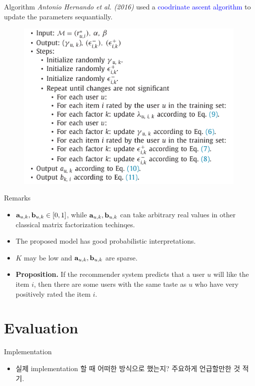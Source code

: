 \documentclass{beamer}
\begin{document}
\begin{frame}{Algorithm}
	\textit{Antonio Hernando et al. (2016)} used a \textcolor{blue}{coodrinate ascent algorithm} to update the parameters sequantially.
	\begin{figure}
		\centering
		\includegraphics[width=0.7\linewidth]{fig/algorithm}
		\label{fig:algorithm}
	\end{figure}
\end{frame}

\begin{frame}{Remarks}
    \begin{itemize}
        \item $ \mathbf a_{u, k}, \mathbf b_{u, k} \in [0, 1] $, while $ \mathbf a_{u, k}, \mathbf b_{u, k} $ can take arbitrary real values in other classical matrix factorization techinqes.
       	\item The proposed model has good probabilistic interpretations.
       	\item $K$ may be low and $\mathbf a_{u, k}, \mathbf b_{u, k}$ are sparse.
       	\item \textbf{Proposition.} If the recommender system predicts that a user $ u $ will like the item $ i $, then there are some users with the same taste as $ u $ who have very positively rated the item $ i $.
    \end{itemize}
\end{frame}

\section{Evaluation}
\begin{frame}{Implementation}
	\begin{itemize}
		\item 실제 implementation 할 때 어떠한 방식으로 했는지? 주요하게 언급할만한 것 적기.
	\end{itemize}
\end{frame}
\end{document}

